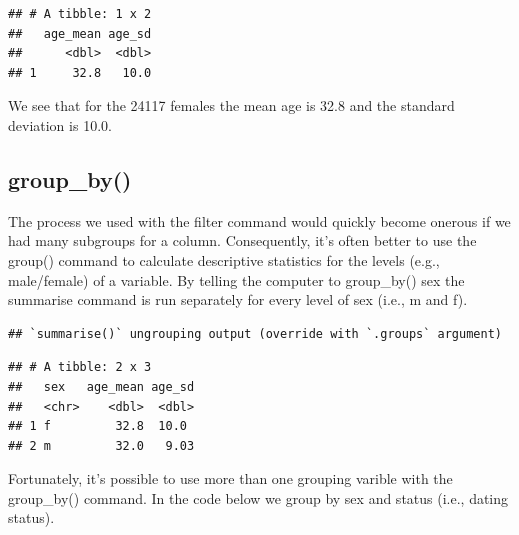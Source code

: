 \documentclass[
]{krantz}
\makeatletter
\newenvironment{Shaded}{\begin{snugshade}}{\end{snugshade}}
\newcommand{\DataTypeTok}[1]{\textcolor[rgb]{0.27,0.27,0.27}{#1}}
\newcommand{\KeywordTok}[1]{\textcolor[rgb]{0.27,0.27,0.27}{\textbf{#1}}}
\newcommand{\NormalTok}[1]{#1}
\newcommand{\OperatorTok}[1]{\textcolor[rgb]{0.43,0.43,0.43}{\textbf{#1}}}
\newcommand{\OtherTok}[1]{\textcolor[rgb]{0.37,0.37,0.37}{#1}}
\newcommand{\StringTok}[1]{\textcolor[rgb]{0.5,0.5,0.5}{#1}}
\newenvironment{kframe}{%
\medskip{}
\setlength{\fboxsep}{.8em}
 \def\at@end@of@kframe{}%
 \ifinner\ifhmode%
  \def\at@end@of@kframe{\end{minipage}}%
  \begin{minipage}{\columnwidth}%
 \fi\fi%
 \def\FrameCommand##1{\hskip\@totalleftmargin \hskip-\fboxsep
 \colorbox{shadecolor}{##1}\hskip-\fboxsep
     \hskip-\linewidth \hskip-\@totalleftmargin \hskip\columnwidth}%
 \MakeFramed {\advance\hsize-\width
   \@totalleftmargin\z@ \linewidth\hsize
   \@setminipage}}%
 {\par\unskip\endMakeFramed%
 \at@end@of@kframe}
\renewenvironment{Shaded}{\begin{kframe}}{\end{kframe}}
\makeatother
\begin{document}
\begin{verbatim}
## # A tibble: 1 x 2
##   age_mean age_sd
##      <dbl>  <dbl>
## 1     32.8   10.0
\end{verbatim}

We see that for the 24117 females the mean age is 32.8 and the standard deviation is 10.0.

\hypertarget{group_by}{%
\subsection{group\_by()}\label{group_by}}

The process we used with the filter command would quickly become onerous if we had many subgroups for a column. Consequently, it's often better to use the group() command to calculate descriptive statistics for the levels (e.g., male/female) of a variable. By telling the computer to group\_by() sex the summarise command is run separately for every level of sex (i.e., m and f).

\begin{Shaded}
\end{Shaded}

\begin{verbatim}
## `summarise()` ungrouping output (override with `.groups` argument)
\end{verbatim}

\begin{verbatim}
## # A tibble: 2 x 3
##   sex   age_mean age_sd
##   <chr>    <dbl>  <dbl>
## 1 f         32.8  10.0 
## 2 m         32.0   9.03
\end{verbatim}

Fortunately, it's possible to use more than one grouping varible with the group\_by() command. In the code below we group by sex and status (i.e., dating status).

\begin{Shaded}
\end{Shaded}
\end{document}
